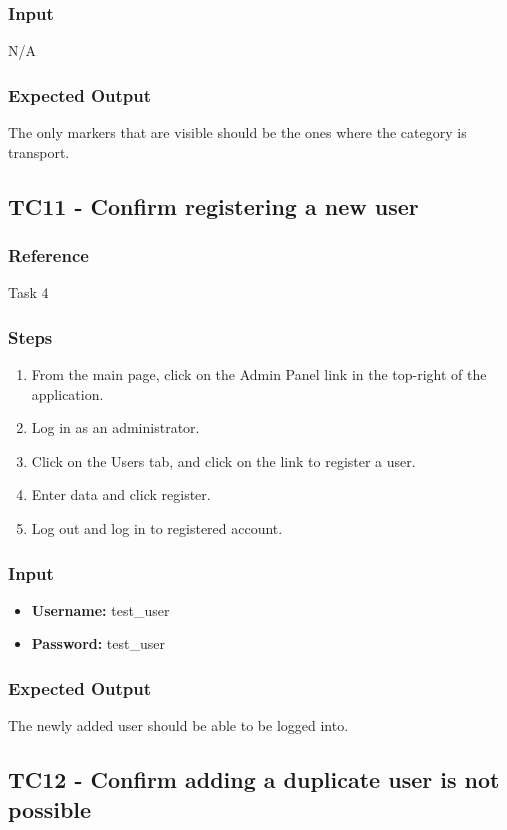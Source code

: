 \subsubsection{Input}
N/A
\subsubsection{Expected Output}
The only markers that are visible should be the ones where the category is transport.
\subsection{TC11 - Confirm registering a new user}

\subsubsection{Reference}

Task 4

\subsubsection{Steps}
\begin{enumerate}
			\item From the main page, click on the Admin Panel link in the top-right of the application.
	\item Log in as an administrator.
	\item Click on the Users tab, and click on the link to register a user.
	\item Enter data and click register.
	\item Log out and log in to registered account.
	\end{enumerate}
\subsubsection{Input}
\begin{itemize}
\item \textbf{Username: } test\_user
\item \textbf{Password: } test\_user	
\end{itemize}
\subsubsection{Expected Output}
The newly added user should be able to be logged into.
\subsection{TC12 - Confirm adding a duplicate user is not possible}
